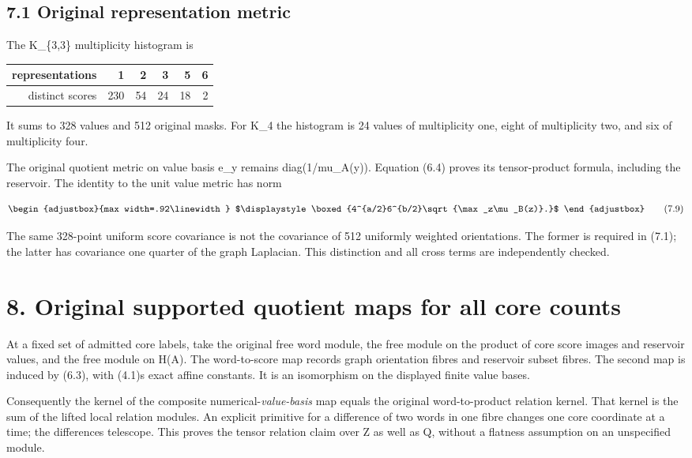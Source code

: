 \subsection{7.1 Original representation metric}\label{n16-original-representation-metric}

The K\_\{3,3\} multiplicity histogram is

\begin{longtable}[]{@{}rrrrrr@{}}
\toprule\noalign{}
representations & 1 & 2 & 3 & 5 & 6 \\
\midrule\noalign{}
\endhead
\bottomrule\noalign{}
\endlastfoot
distinct scores & 230 & 54 & 24 & 18 & 2 \\
\end{longtable}

It sums to 328 values and 512 original masks. For K\_4 the histogram is 24 values of multiplicity one, eight of multiplicity two, and six of multiplicity four.

The original quotient metric on value basis e\_y remains diag(1/mu\_A(y)). Equation (6.4) proves its tensor-product formula, including the reservoir. The identity to the unit value metric has norm

\[
\begin{adjustbox}{max width=.92\linewidth}
$\displaystyle \boxed{4^{a/2}6^{b/2}\sqrt{\max_z\mu_B(z)}.}$
\end{adjustbox}
\tag{7.9}
\]

The same 328-point uniform score covariance is not the covariance of 512 uniformly weighted orientations. The former is required in (7.1); the latter has covariance one quarter of the graph Laplacian. This distinction and all cross terms are independently checked.

\section{8. Original supported quotient maps for all core counts}\label{n16-original-supported-quotient-maps-for-all-core-counts}

At a fixed set of admitted core labels, take the original free word module, the free module on the product of core score images and reservoir values, and the free module on H(A). The word-to-score map records graph orientation fibres and reservoir subset fibres. The second map is induced by (6.3), with (4.1)\textquotesingle s exact affine constants. It is an isomorphism on the displayed finite value bases.

Consequently the kernel of the composite numerical-\emph{value-basis} map equals the original word-to-product relation kernel. That kernel is the sum of the lifted local relation modules. An explicit primitive for a difference of two words in one fibre changes one core coordinate at a time; the differences telescope. This proves the tensor relation claim over Z as well as Q, without a flatness assumption on an unspecified module.

